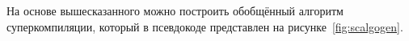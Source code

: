 

%
% 

На основе вышесказанного можно построить обобщённый алгоритм суперкомпиляции,
который в псевдокоде представлен на рисунке~\ref{fig:scalgogen}.

